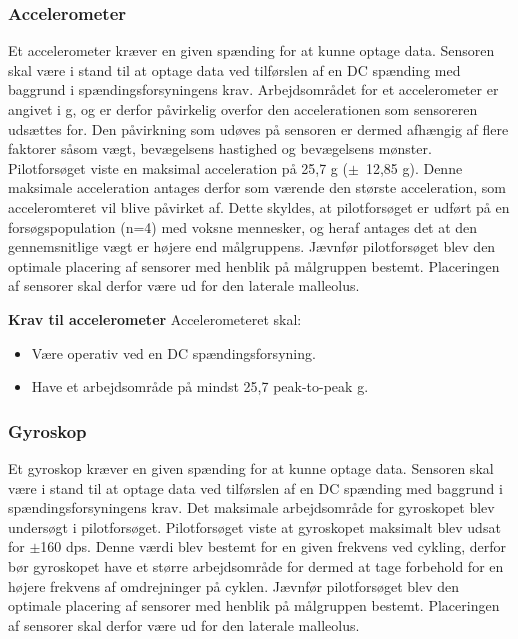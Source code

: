\subsubsection{Accelerometer}
Et accelerometer kræver en given spænding for at kunne optage data. Sensoren skal være i stand til at optage data ved tilførslen af en DC spænding med baggrund i spændingsforsyningens krav. Arbejdsområdet for et accelerometer er angivet i g, og er derfor påvirkelig overfor den accelerationen som sensoreren udsættes for. Den påvirkning som udøves på sensoren er dermed afhængig af flere faktorer såsom vægt, bevægelsens hastighed og bevægelsens mønster. \newline
Pilotforsøget viste en maksimal acceleration på 25,7 g ($\pm$~12,85 g). Denne maksimale acceleration antages derfor som værende den største acceleration, som acceleromteret vil blive påvirket af. Dette skyldes, at pilotforsøget er udført på en forsøgspopulation (n=4) med voksne mennesker, og heraf antages det at den gennemsnitlige vægt er højere end målgruppens. Jævnfør pilotforsøget blev den optimale placering af sensorer med henblik på målgruppen bestemt. Placeringen af sensorer skal derfor være ud for den laterale malleolus.


\textbf{Krav til accelerometer} \newline 
Accelerometeret skal:
\begin{itemize}
\item Være operativ ved en DC spændingsforsyning.
\item Have et arbejdsområde på mindst 25,7 peak-to-peak g.
\end{itemize}

\subsubsection{Gyroskop} 
Et gyroskop kræver en given spænding for at kunne optage data. Sensoren skal være i stand til at optage data ved tilførslen af en DC spænding med baggrund i spændingsforsyningens krav. Det maksimale arbejdsområde for gyroskopet blev undersøgt i pilotforsøget. Pilotforsøget viste at gyroskopet maksimalt blev udsat for $\pm$160 dps. Denne værdi blev bestemt for en given frekvens ved cykling, derfor bør gyroskopet have et større arbejdsområde for dermed at tage forbehold for en højere frekvens af omdrejninger på cyklen. Jævnfør pilotforsøget blev den optimale placering af sensorer med henblik på målgruppen bestemt. Placeringen af sensorer skal derfor være ud for den laterale malleolus.


